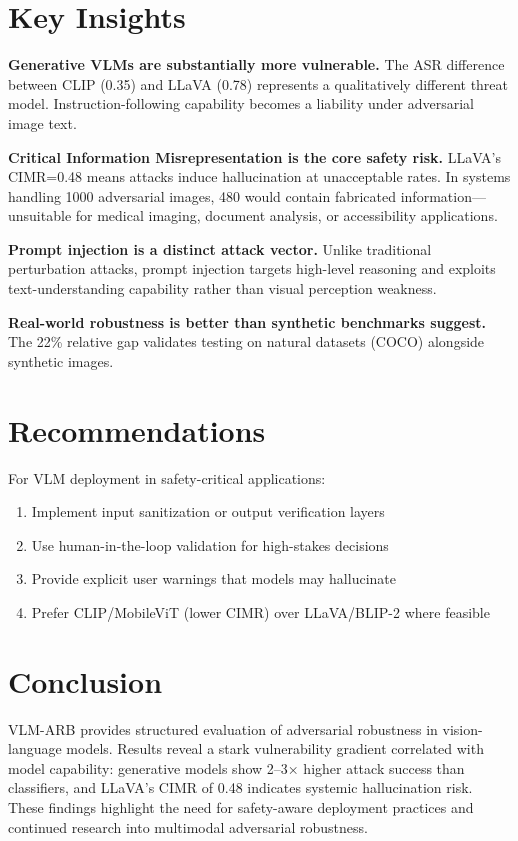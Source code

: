 \documentclass[11pt]{article}
\begin{document}
\section{Key Insights}

\textbf{Generative VLMs are substantially more vulnerable.} The ASR difference between CLIP (0.35) and LLaVA (0.78) represents a qualitatively different threat model. Instruction-following capability becomes a liability under adversarial image text.

\textbf{Critical Information Misrepresentation is the core safety risk.} LLaVA's CIMR=0.48 means attacks induce hallucination at unacceptable rates. In systems handling 1000 adversarial images, 480 would contain fabricated information---unsuitable for medical imaging, document analysis, or accessibility applications.

\textbf{Prompt injection is a distinct attack vector.} Unlike traditional perturbation attacks, prompt injection targets high-level reasoning and exploits text-understanding capability rather than visual perception weakness.

\textbf{Real-world robustness is better than synthetic benchmarks suggest.} The 22\% relative gap validates testing on natural datasets (COCO) alongside synthetic images.

\section{Recommendations}

For VLM deployment in safety-critical applications:
\begin{enumerate}[leftmargin=1.5em, topsep=0pt]
    \item Implement input sanitization or output verification layers
    \item Use human-in-the-loop validation for high-stakes decisions
    \item Provide explicit user warnings that models may hallucinate
    \item Prefer CLIP/MobileViT (lower CIMR) over LLaVA/BLIP-2 where feasible
\end{enumerate}

\section{Conclusion}

VLM-ARB provides structured evaluation of adversarial robustness in vision-language models. Results reveal a stark vulnerability gradient correlated with model capability: generative models show 2--3× higher attack success than classifiers, and LLaVA's CIMR of 0.48 indicates systemic hallucination risk. These findings highlight the need for safety-aware deployment practices and continued research into multimodal adversarial robustness.
\end{document}
